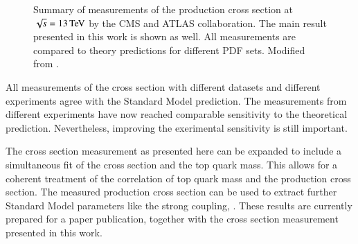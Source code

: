 \begin{figure}[htbp!]
  \begin{center}

\caption{Summary of measurements of the \ttbar production cross section at $\sqrt{s}=13 \,\text{Te\hspace{-.08em}V}$ by the CMS and ATLAS collaboration.
The main result presented in this work is shown as well. All measurements are compared to theory predictions for different PDF sets.
Modified from \cite{Topsum}.
       \label{fig:sum}}
  \end{center}
\end{figure}

All measurements of the \ttbar cross section with different datasets and different experiments agree with the Standard Model prediction.
The measurements from different experiments have now reached comparable sensitivity to the theoretical prediction. Nevertheless, improving the exerimental sensitivity is still important.

The cross section measurement as presented here can be expanded to include a simultaneous fit of the cross section and the top quark mass.
This allows for a coherent treatment of the correlation of top quark mass and the \ttbar production cross section.
The measured \ttbar production cross section can be used to extract
further Standard Model parameters like the strong coupling, \as. These results are currently prepared for a paper publication, together with the cross section measurement presented in this work.

